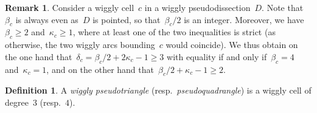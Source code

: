 \documentclass{amsart}
\theoremstyle{definition}
\newtheorem{definition}[theorem]{Definition}
\newtheorem{remark}[theorem]{Remark}
\newcommand{\darkblue}{\color{darkblue}} %
\newcommand{\defn}[1]{\textsl{\darkblue #1}} %
\begin{document}
\begin{remark}
\label{rem:degree}
Consider a wiggly cell~$c$ in a wiggly pseudodissection~$D$.
Note that~$\beta_c$ is always even as~$D$ is pointed, so that~$\beta_c/2$ is an integer.
Moreover, we have~$\beta_c \ge 2$ and~$\kappa_c \ge 1$, where at least one of the two inequalities is strict (as otherwise, the two wiggly arcs bounding~$c$ would coincide).
We thus obtain on the one hand that~$\delta_c = \beta_c/2+2\kappa_c-1 \ge 3$ with equality if and only if~$\beta_c = 4$ and~$\kappa_c = 1$, and on the other hand that~$\beta_c/2+\kappa_c-1 \ge 2$.
\end{remark}

\begin{definition}
A \defn{wiggly pseudotriangle} (resp.~\defn{pseudoquadrangle}) is a wiggly cell of degree~$3$ (resp.~$4$).
\end{definition}
\end{document}
